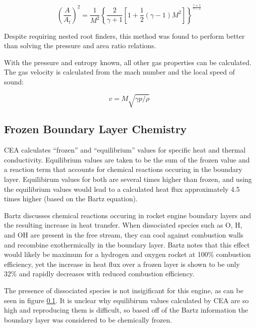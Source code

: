 \documentclass[11pt]{article}
\begin{document}
\begin{equation}
    \left( \frac{A}{A_t}\right)^2 = \frac{1}{M^2} \left\{ \frac{2}{\gamma + 1} \left[ 1 + \frac{1}{2} (\gamma - 1) M^2 \right] \right\}^{\frac{\gamma + 1}{\gamma - 1}}
\end{equation}

Despite requiring nested root finders, this method was found to perform better than solving the pressure and area ratio relations.

With the pressure and entropy known, all other gas properties can be calculated. The gas velocity is calculated from the mach number and the local speed of sound:

\begin{equation}
  v = M \sqrt{\gamma p / \rho}
\end{equation}

\subsection{Frozen Boundary Layer Chemistry}

CEA calculates ``frozen'' and ``equilibrium'' values for specific heat and thermal conductivity. Equilibrium values are taken to be the sum of the frozen value and a reaction term that accounts for chemical reactions occuring in the boundary layer. Equilibirum values for both are several times higher than frozen, and using the equilibrium values would lead to a calculated heat flux approximately 4.5 times higher (based on the Bartz equation).

Bartz \cite{page 46} discusses chemical reactions occuring in rocket engine boundary layers and the resulting increase in heat transfer. When dissociated species such as O, H, and OH are present in the free stream, they can cool against combustion walls and recombine exothermically in the boundary layer. Bartz notes that this effect would likely be maximum for a hydrogen and oxygen rocket at 100\% combustion efficiency, yet the increase in heat flux over a frozen layer is shown to be only 32\% and rapidly decreases with reduced combustion efficiency.

The presence of dissociated species is not insigificant for this engine, as can be seen in figure \ref{}. It is unclear why equilibirum values calculated by CEA are so high and reproducing them is difficult, so based off of the Bartz information the boundary layer was considered to be chemically frozen.
\end{document}
